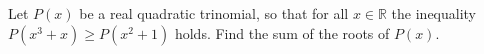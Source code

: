 Let $P(x)$ be a real quadratic trinomial, so that for all $x\in \mathbb{R}$ the inequality $P(x^3+x)\geq P(x^2+1)$ holds. Find the sum of the roots of $P(x)$.